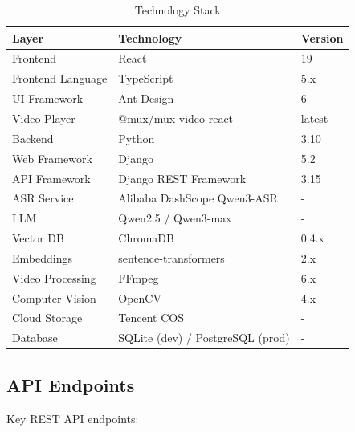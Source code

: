 \documentclass[12pt,a4paper]{article}
\begin{document}
\begin{table}[H]
    \centering
    \caption{Technology Stack}
    \begin{tabular}{@{}lll@{}}
        \toprule
        \textbf{Layer} & \textbf{Technology} & \textbf{Version} \\ \midrule
        Frontend & React & 19 \\
        Frontend Language & TypeScript & 5.x \\
        UI Framework & Ant Design & 6 \\
        Video Player & @mux/mux-video-react & latest \\
        Backend & Python & 3.10 \\
        Web Framework & Django & 5.2 \\
        API Framework & Django REST Framework & 3.15 \\
        ASR Service & Alibaba DashScope Qwen3-ASR & - \\
        LLM & Qwen2.5 / Qwen3-max & - \\
        Vector DB & ChromaDB & 0.4.x \\
        Embeddings & sentence-transformers & 2.x \\
        Video Processing & FFmpeg & 6.x \\
        Computer Vision & OpenCV & 4.x \\
        Cloud Storage & Tencent COS & - \\
        Database & SQLite (dev) / PostgreSQL (prod) & - \\ \bottomrule
    \end{tabular}
\end{table}

\subsection{API Endpoints}

Key REST API endpoints:
\end{document}
